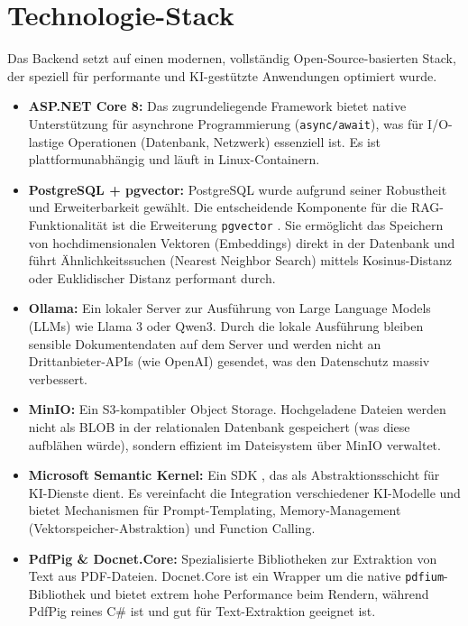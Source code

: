 \section{Technologie-Stack}
Das Backend setzt auf einen modernen, vollständig Open-Source-basierten Stack, der speziell für performante und KI-gestützte Anwendungen optimiert wurde.

\begin{itemize}
	\item \textbf{ASP.NET Core 8:} Das zugrundeliegende Framework \cite{aspnetcore} bietet native Unterstützung für asynchrone Programmierung (\texttt{async/await}), was für I/O-lastige Operationen (Datenbank, Netzwerk) essenziell ist. Es ist plattformunabhängig und läuft in Linux-Containern.
	\item \textbf{PostgreSQL + pgvector:} PostgreSQL wurde aufgrund seiner Robustheit und Erweiterbarkeit gewählt. Die entscheidende Komponente für die RAG-Funktionalität ist die Erweiterung \texttt{pgvector} \cite{pgvector}. Sie ermöglicht das Speichern von hochdimensionalen Vektoren (Embeddings) direkt in der Datenbank und führt Ähnlichkeitssuchen (Nearest Neighbor Search) mittels Kosinus-Distanz oder Euklidischer Distanz performant durch.
	\item \textbf{Ollama:} Ein lokaler Server zur Ausführung von Large Language Models (LLMs) wie Llama 3 oder Qwen3. Durch die lokale Ausführung bleiben sensible Dokumentendaten auf dem Server und werden nicht an Drittanbieter-APIs (wie OpenAI) gesendet, was den Datenschutz massiv verbessert.
	\item \textbf{MinIO:} Ein S3-kompatibler Object Storage. Hochgeladene Dateien werden nicht als BLOB in der relationalen Datenbank gespeichert (was diese aufblähen würde), sondern effizient im Dateisystem über MinIO verwaltet.
    \item \textbf{Microsoft Semantic Kernel:} Ein SDK \cite{semantickernel}, das als Abstraktionsschicht für KI-Dienste dient. Es vereinfacht die Integration verschiedener KI-Modelle und bietet Mechanismen für Prompt-Templating, Memory-Management (Vektorspeicher-Abstraktion) und Function Calling.
    \item \textbf{PdfPig \& Docnet.Core:} Spezialisierte Bibliotheken zur Extraktion von Text aus PDF-Dateien. Docnet.Core ist ein Wrapper um die native \texttt{pdfium}-Bibliothek und bietet extrem hohe Performance beim Rendern, während PdfPig reines C\# ist und gut für Text-Extraktion geeignet ist.
\end{itemize}
